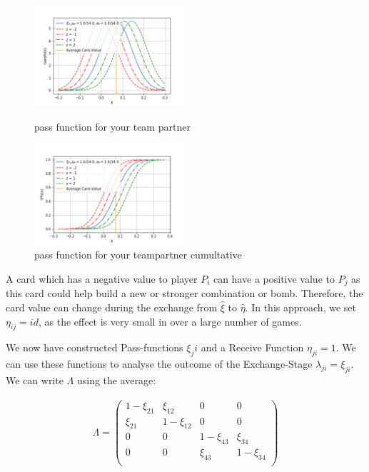\begin{figure}[h]
    \centering
    \includegraphics[width=0.5\textwidth]{Bilder/pass_function_p}
    \caption{pass function for your team partner}
    \label{fig:meine-grafik}
    \centering
    \includegraphics[width=0.5\textwidth]{Bilder/pass_function_p_cumultative}
    \caption{pass function for your teampartner cumultative}
    \label{fig:meine-grafik}
\end{figure}

A card which has a negative value to player $P_i$ can have a positive value to $P_j$ as this card could help build a new or stronger combination or bomb. Therefore, the card value can change during the exchange from $\hat{\xi}$ to $\hat{\eta}$. In this approach, we set $\eta_{ij} = id$, as the effect is very small in over a large number of games. 

We now have constructed Pass-functions $\xi_ji$ and a Receive Function $\eta_{ji} = 1$. We can use these functions to analyse the outcome of the Exchange-Stage $\lambda_{ji} = \xi_{ji}$. We can write $\Lambda$ using the average:

\begin{gather*}
\Lambda = \begin{pmatrix} 
1 - \xi_{21} & \xi_{12} & 0 & 0 \\
\xi_{21} & 1 - \xi_{12} & 0 & 0 \\
0 & 0 & 1 -  \xi_{43} & \xi_{34} \\
0 & 0 &  \xi_{43} & 1 - \xi_{34} \\
\end{pmatrix}
\end{gather*}

